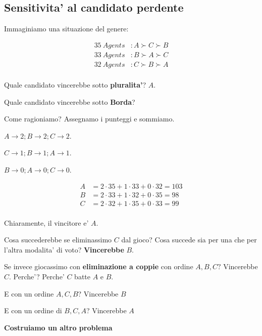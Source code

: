 \subsection{Sensitivita' al candidato perdente}

Immaginiamo una situazione del genere:

\begin{equation}
    \begin{aligned}
        35 \ Agents & : A \succ C \succ B \\
        33 \ Agents & : B \succ A \succ C \\
        32 \ Agents & : C \succ B \succ A \\
    \end{aligned}
\end{equation}

Quale candidato vincerebbe sotto \textbf{pluralita'}? $A$.

Quale candidato vincerebbe sotto \textbf{Borda}?

Come ragioniamo? Assegnamo i punteggi e sommiamo.

$A \rightarrow 2; B \rightarrow 2; C \rightarrow 2$.

$C \rightarrow 1; B \rightarrow 1; A \rightarrow 1$.

$B \rightarrow 0; A \rightarrow 0; C \rightarrow 0$.

\begin{equation}
    \begin{aligned}
        A &= 2 \cdot 35 + 1 \cdot 33 + 0 \cdot 32 = 103 \\
        B &= 2 \cdot 33 + 1 \cdot 32 + 0 \cdot 35 = 98  \\
        C &= 2 \cdot 32 + 1 \cdot 35 + 0 \cdot 33 = 99  \\
    \end{aligned}
\end{equation}

Chiaramente, il vincitore e' $A$.

Cosa succederebbe se eliminassimo $C$ dal gioco? Cosa succede sia per una che per l'altra modalita' di voto? \textbf{Vincerebbe} $B$.

Se invece giocassimo con \textbf{eliminazione a coppie} con ordine $A,B,C?$ 
Vincerebbe $C$. Perche'? Perche' $C$ batte $A$ e $B$.

E con un ordine $A,C,B$? Vincerebbe $B$

E con un ordine di $B,C,A$? Vincerebbe $A$

\textbf{Costruiamo un altro problema}

